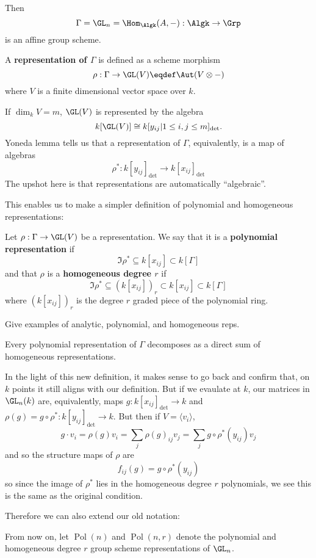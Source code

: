 \documentclass[12pt]{article}
\DeclareMathOperator{\Pol}{Pol}
\begin{document}
	Then 
	\[\Gamma=\GL_n=\Hom_{\Algk}(A,-):\Algk\to\Grp\]
	is an affine group scheme. 
	\begin{defn}
		A \textbf{representation of $\Gamma$} is defined as a scheme morphism 
		\[\rho:\Gamma\to \GL(V)\eqdef \Aut(V\otimes -)\]
		where $V$ is a finite dimensional vector space over $k$.
	\end{defn}
	\begin{rmk}
		If $\dim_k V=m$, $\GL(V)$ is represented by the algebra 
		\[k[\GL(V)]\cong k[y_{ij}|1\le i,j\le m]_{\det}.\]
		Yoneda lemma tells us that a representation of $\Gamma$, equivalently, is a map of algebras 
		\[\rho^\ast:k[y_{ij}]_{\det}\to k[x_{ij}]_{\det}\]
		The upshot here is that representations are automatically ``algebraic''.
	\end{rmk}
	This enables us to make a simpler definition of polynomial and homogeneous representations:
	\begin{defn}
		Let $\rho:\Gamma\to \GL(V)$ be a representation. We say that it is a \textbf{polynomial representation} if 
		\[\Im \rho^\ast\subseteq k[x_{ij}]\subset k[\Gamma]\]
		and that $\rho$ is a \textbf{homogeneous degree $r$} if 
		\[\Im\rho^\ast\subseteq (k[x_{ij}])_r\subset k[x_{ij}]\subset k[\Gamma]\]
		where $(k[x_{ij}])_r$ is the degree $r$ graded piece of the polynomial ring.
	\end{defn}
	{\color{red} Give examples of analytic, polynomial, and homogeneous reps.}
	\begin{thm}[Schur]
		Every polynomial representation of $\Gamma$ decomposes as a direct sum of homogeneous representations.
	\end{thm}
	In the light of this new definition, it makes sense to go back and confirm that, on $k$ points it still aligns with our 
	definition. But if we evaulate at $k$, our matrices in $\GL_n(k)$ are, equivalently, maps $g:k[x_{ij}]_{\det}\to k$ and
	$\rho(g)=g\circ\rho^\ast:k[y_{ij}]_{\det}\to k$. But then if $V=\langle v_i\rangle$,
	\[g\cdot v_i=\rho(g)v_i=\sum_j \rho(g)_{ij}v_j=\sum_j g\circ\rho^\ast(y_{ij})v_j\]
	and so the structure maps of $\rho$ are 
	\[f_{ij}(g)=g\circ\rho^\ast(y_{ij})\]
	so since the image of $\rho^\ast$ lies in the homogeneous degree $r$ polynomials, we see this is the same as the original condition.

	Therefore we can also extend our old notation:
	\begin{defn}
		From now on, let $\Pol(n)$ and $\Pol(n,r)$ denote the polynomial and homogeneous degree $r$ group scheme 
		representations of $\GL_n$.
	\end{defn}
\end{document}
